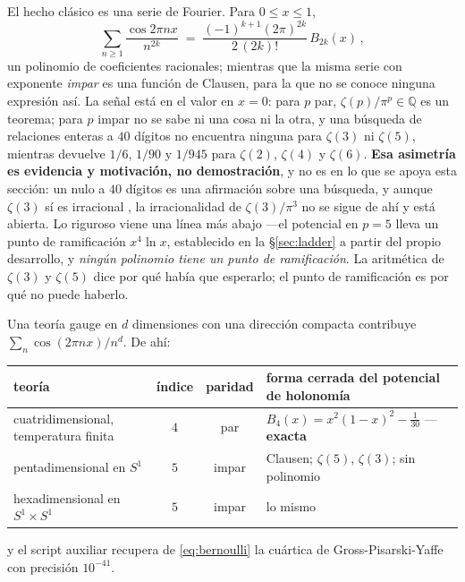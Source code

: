 \documentclass[11pt,a4paper]{article}
\begin{document}
El hecho clásico es una serie de Fourier. Para $0\le x\le 1$,
\begin{equation}\label{eq:bernoulli}
  \sum_{n\ge1}\frac{\cos 2\pi n x}{n^{2k}}
   \;=\;\frac{(-1)^{k+1}(2\pi)^{2k}}{2\,(2k)!}\,B_{2k}(x)\,,
\end{equation}
un polinomio de coeficientes racionales; mientras que la misma serie con exponente \emph{impar} es
una función de Clausen, para la que no se conoce ninguna expresión así. La señal está en el valor en
$x=0$: para $p$ par, $\zeta(p)/\pi^p\in\mathbb{Q}$ es un teorema; para $p$ impar no se sabe ni una
cosa ni la otra, y una búsqueda de relaciones enteras a $40$ dígitos no encuentra ninguna para
$\zeta(3)$ ni $\zeta(5)$, mientras devuelve $1/6$, $1/90$ y $1/945$ para $\zeta(2)$, $\zeta(4)$ y
$\zeta(6)$. \textbf{Esa asimetría es evidencia y motivación, no demostración}, y no es en lo que se
apoya esta sección: un nulo a $40$ dígitos es una afirmación sobre una búsqueda, y aunque
$\zeta(3)$ sí es irracional \cite{Apery}, la irracionalidad de $\zeta(3)/\pi^3$ no se sigue de ahí
y está abierta. Lo riguroso viene una línea más abajo ---el
potencial en $p=5$ lleva un punto de ramificación $x^4\ln x$, establecido en la
\S\ref{sec:ladder} a partir del propio desarrollo, y \emph{ningún polinomio tiene un punto de
ramificación}. La aritmética de $\zeta(3)$ y $\zeta(5)$ dice por qué había que esperarlo; el punto
de ramificación es por qué no puede haberlo.

Una teoría gauge en $d$ dimensiones con una dirección compacta contribuye
$\sum_n \cos(2\pi n x)/n^{d}$. De ahí:

\begin{center}\small
{}
\begin{tabular}{lccl}
\toprule
\rowcolor{hdrblue!10}teoría & índice & paridad & forma cerrada del potencial de holonomía\\
\midrule
\rowcolor{okgreen!12}cuatridimensional, temperatura finita & $4$ & par & $B_4(x)=x^2(1-x)^2-\tfrac1{30}$ --- \textbf{exacta}\\
\rowcolor{amber!12}pentadimensional en $S^1$ \cite{vGIQ,HY04} & $5$ & impar & Clausen; $\zeta(5)$, $\zeta(3)$; sin polinomio\\
\rowcolor{amber!12}hexadimensional en $S^1\times S^1$ \cite{KM25} & $5$ & impar & lo mismo\\
\bottomrule
\end{tabular}
\end{center}

\noindent y el script auxiliar recupera de \eqref{eq:bernoulli} la cuártica de Gross-Pisarski-Yaffe
con precisión $10^{-41}$.
\end{document}
